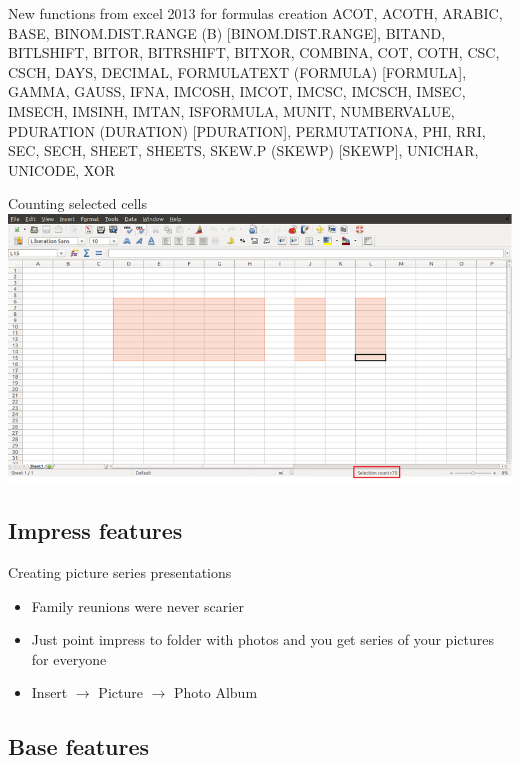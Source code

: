 \documentclass{beamer}
\begin{document}
\begin{frame}[t]{New functions from excel 2013 for formulas creation}
ACOT, ACOTH, ARABIC, BASE, BINOM.DIST.RANGE (B) [BINOM.DIST.RANGE], BITAND, BITLSHIFT, BITOR, BITRSHIFT, BITXOR, COMBINA, COT, COTH, CSC, CSCH, DAYS, DECIMAL, FORMULATEXT (FORMULA) [FORMULA], GAMMA, GAUSS, IFNA, IMCOSH, IMCOT, IMCSC, IMCSCH, IMSEC, IMSECH, IMSINH, IMTAN, ISFORMULA, MUNIT, NUMBERVALUE, PDURATION (DURATION) [PDURATION], PERMUTATIONA, PHI, RRI, SEC, SECH, SHEET, SHEETS, SKEW.P (SKEWP) [SKEWP], UNICHAR, UNICODE, XOR
\end{frame}

\begin{frame}{Counting selected cells}
	\includegraphics[width= 1.0\linewidth]{cells-selection-count-calc.png}
\end{frame}

\subsection{Impress features}

\begin{frame}[t]{Creating picture series presentations}
	\begin{itemize}
	\item Family reunions were never scarier
	\item Just point impress to folder with photos and you get series of your pictures for everyone
	\item Insert $\rightarrow$ Picture $\rightarrow$ Photo Album
	\end{itemize}

\end{frame}

\subsection{Base features}
\end{document}
